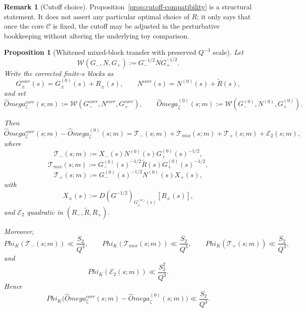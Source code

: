 \documentclass[11pt,a4paper]{amsart}
\def\Omega{Omega}%
\def\Phi{Phi}%
\def\corr{corr}%
\def\mix{mix}%
\theoremstyle{plain}
\newtheorem{proposition}[theorem]{Proposition}
\theoremstyle{definition}
\newtheorem{remark}[theorem]{Remark}
\newcommand{\corr}{\mathrm{corr}}
\newcommand{\mix}{\mathrm{mix}}
\begin{document}
\begin{remark}[Cutoff choice]
\label{rem:cutoff-choice}
Proposition~\ref{prop:cutoff-compatibility} is a structural statement. It
does not assert any particular optimal choice of $R$; it only says that once
the core $\mathcal C$ is fixed, the cutoff may be adjusted in the perturbative
bookkeeping without altering the underlying toy comparison.
\end{remark}

\begin{proposition}[Whitened mixed-block transfer with preserved $Q^{-3}$ scale]
\label{prop:whitened-mixed-transfer}
Let
\[
\mathcal W(G_-,N,G_+):=G_-^{-1/2}NG_+^{-1/2}.
\]
Write the corrected finite-$s$ blocks as
\[
G_\pm^{\corr}(s)=G_\pm^{(0)}(s)+R_\pm(s),
\qquad
N^{\corr}(s)=N^{(0)}(s)+\widetilde R(s),
\]
and set
\[
\widehat\Omega_\zeta^{\corr}(s;m):=\mathcal W(G_-^{\corr},N^{\corr},G_+^{\corr}),
\qquad
\widehat\Omega_\zeta^{(0)}(s;m):=\mathcal W(G_-^{(0)},N^{(0)},G_+^{(0)}).
\]

Then
\[
\widehat\Omega_\zeta^{\corr}(s;m)-\widehat\Omega_\zeta^{(0)}(s;m)
=
\mathcal T_-(s;m)+\mathcal T_{\mix}(s;m)+\mathcal T_+(s;m)+\mathcal E_2(s;m),
\]
where
\[
\mathcal T_-(s;m):=X_-(s)N^{(0)}(s)G_+^{(0)}(s)^{-1/2},
\]
\[
\mathcal T_{\mix}(s;m):=G_-^{(0)}(s)^{-1/2}\widetilde R(s)G_+^{(0)}(s)^{-1/2},
\]
\[
\mathcal T_+(s;m):=G_-^{(0)}(s)^{-1/2}N^{(0)}(s)X_+(s),
\]
with
\[
X_\pm(s):=D(G^{-1/2})_{G_\pm^{(0)}(s)}[R_\pm(s)],
\]
and $\mathcal E_2$ quadratic in $(R_-,\widetilde R,R_+)$.

Moreover,
\[
\Phi_K(\mathcal T_-(s;m))\ll \frac{S_2}{Q^3},
\qquad
\Phi_K(\mathcal T_{\mix}(s;m))\ll \frac{S_2}{Q^3},
\qquad
\Phi_K(\mathcal T_+(s;m))\ll \frac{S_2}{Q^3},
\]
and
\[
\Phi_K(\mathcal E_2(s;m))\ll \frac{S_2^2}{Q^3}.
\]
Hence
\[
\boxed{
\Phi_K\!\bigl(\widehat\Omega_\zeta^{\corr}(s;m)-\widehat\Omega_\zeta^{(0)}(s;m)\bigr)
\ll
\frac{S_2}{Q^3}.
}
\]
\end{proposition}
\end{document}
